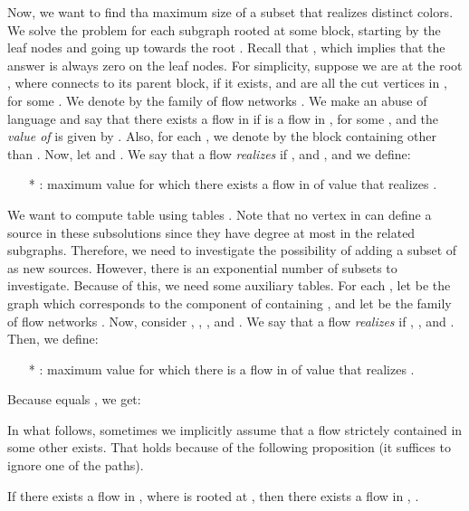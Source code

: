 \documentclass{llncs}
\begin{document}
Now, we want to find tha maximum size of a subset  that realizes distinct colors. We solve the problem for each subgraph rooted at some block, starting by the leaf nodes and going up towards the root . Recall that , which implies that the answer is always zero on the leaf nodes. For simplicity, suppose we are at the root , where  connects  to its parent block, if it exists, and  are all the cut vertices in , for some . We denote by  the family of flow networks . We make an abuse of language and say that there exists a flow  in  if  is a flow in , for some , and the \emph{value of } is given by . Also, for each , we denote by  the block containing  other than . Now, let  and . We say that a flow  \emph{realizes } if , and , and we define:

\begin{itemize}
\item[*] : maximum value  for which there exists a flow  in  of value  that realizes .
\end{itemize}

We want to compute table  using tables . Note that no vertex in  can define a source in these subsolutions since they have degree at most  in the related subgraphs. Therefore, we need to investigate the possibility of adding a subset of  as new sources. However, there is an exponential number of subsets to investigate. Because of this, we need some auxiliary tables. For each , let  be the graph which corresponds to the component of  containing , and let  be the family of flow networks . 
Now, consider , , , and .  We say that a flow  \emph{realizes } if , , and . Then, we define:

\begin{itemize}
\item[*] : maximum value  for which there is a flow in  of value  that realizes .
\end{itemize}
 
Because  equals , we get:


In what follows, sometimes we implicitly assume that a flow strictely contained in some other exists. That holds because of the following proposition (it suffices to ignore one of the paths).

\begin{proposition}\label{prop:1lessflow}
If there exists a flow  in , where  is rooted at , then there exists a flow  in , .
\end{proposition}
\end{document}
